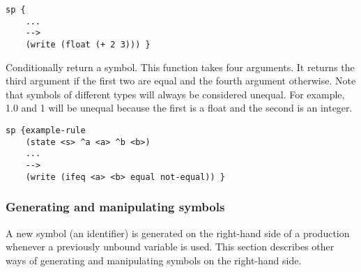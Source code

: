 \begin{description}
\begin{verbatim}
sp {
    ...
    -->
    (write (float (+ 2 3))) }
\end{verbatim}

\item [\soarb{ifeq} --- ] Conditionally return a symbol.
        This function takes four arguments. It returns the third argument if
        the first two are equal and the fourth argument otherwise. Note that
        symbols of different types will always be considered unequal. For example,
        1.0 and 1 will be unequal because the first is a float and the second is
        an integer.

\begin{verbatim}
sp {example-rule
    (state <s> ^a <a> ^b <b>)
    ...
    -->
    (write (ifeq <a> <b> equal not-equal)) }
\end{verbatim}
\end{description}

\subsubsection{Generating and manipulating symbols}

A new symbol (an identifier) is generated on the right-hand side of a
production whenever a previously unbound variable is used. This section
describes other ways of generating and manipulating symbols on the right-hand
side. 

